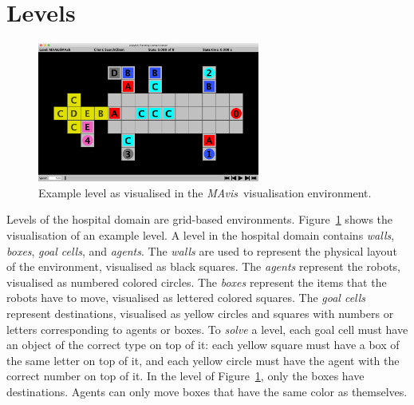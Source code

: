 \documentclass[12pt,a4paper]{article}
\def\mavis{{\itshape MAvis}}
\begin{document}
\section{Levels}\label{sec:env_description}
\begin{figure}
  \begin{center}
    \includegraphics[width=0.65\textwidth]{MAAIoliMAsh}
  \end{center}
  \caption{Example level as visualised in the \mavis\ visualisation environment. }\label{figu:aioli}
\end{figure}
Levels of the hospital domain are grid-based environments. Figure~\ref{figu:aioli} shows the visualisation of an example level. A level in the hospital domain contains \emph{walls}, \emph{boxes}, \emph{goal cells}, and \emph{agents}. The \emph{walls} are used to represent the physical layout of the environment, visualised as black squares. The \emph{agents} represent the robots, visualised as numbered colored circles. The \emph{boxes} represent the items that the robots have to move, visualised as lettered colored squares. The \emph{goal cells} represent destinations, visualised as yellow circles and squares with numbers or letters corresponding to agents or boxes. To \emph{solve} a level, each goal cell must have an object of the correct type on top of it: each yellow square must have a box of the same letter on top of it, and each yellow circle must have the agent with the correct number on top of it. In the level of Figure~\ref{figu:aioli}, only the boxes have destinations.  Agents can only move boxes that have the same color as themselves.  
\end{document}
